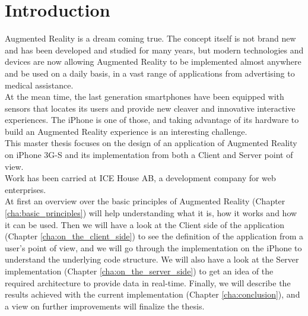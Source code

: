 \chapter{Introduction}
\label{cha:introduction}

Augmented Reality is a dream coming true. The concept itself is not brand new and has been developed and studied for many years, but modern technologies and devices are now allowing Augmented Reality to be implemented almost anywhere and be used on a daily basis, in a vast range of applications from advertising to medical assistance.\\

At the mean time, the last generation smartphones have been equipped with sensors that locates its users and provide new cleaver and innovative interactive experiences. The iPhone is one of those, and taking advantage of its hardware to build an Augmented Reality experience is an interesting challenge.\\

This master thesis focuses on the design of an application of Augmented Reality on iPhone 3G-S and its implementation from both a Client and Server point of view.\\

Work has been carried at ICE House AB, a development company for web enterprises.\\

At first an overview over the basic principles of Augmented Reality (Chapter \ref{cha:basic_principles}) will help understanding what it is, how it works and how it can be used. Then we will have a look at the Client side of the application (Chapter \ref{cha:on_the_client_side}) to see the definition of the application from a user's point of view, and we will go through the implementation on the iPhone to understand the underlying code structure. We will also have a look at the Server implementation (Chapter \ref{cha:on_the_server_side}) to get an idea of the required architecture to provide data in real-time. Finally, we will describe the results achieved with the current implementation (Chapter \ref{cha:conclusion}), and a view on further improvements will finalize the thesis.
